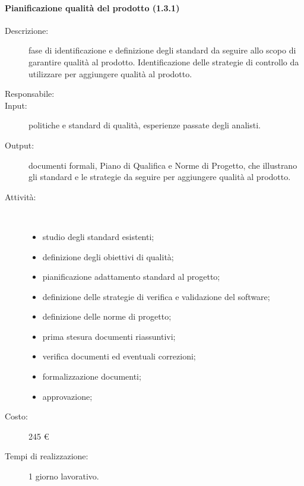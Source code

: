 \begin{description}
\paragraph{Pianificazione qualit\`{a} del prodotto (1.3.1)}
\begin{description}
\item[Descrizione:] fase di identificazione e definizione degli standard da seguire allo scopo di garantire qualit\`{a} al prodotto. Identificazione delle strategie di controllo da utilizzare per aggiungere qualit\`{a} al prodotto.
\item[Responsabile:] 
\item[Input:] politiche e standard di qualità, esperienze passate degli analisti.
\item[Output:] documenti formali, Piano di Qualifica e Norme di Progetto, che illustrano gli standard e le strategie da seguire per aggiungere qualità al prodotto.
\item[Attività:]\mbox{}\\[-1.5\baselineskip]
	\begin{itemize}
	\item studio degli standard esistenti;
	\item definizione degli obiettivi di qualità;
	\item pianificazione adattamento standard al progetto;
	\item definizione delle strategie di verifica e validazione del software;
	\item definizione delle norme di progetto;
	\item prima stesura documenti riassuntivi;
	\item verifica documenti ed eventuali correzioni;
	\item formalizzazione documenti;
	\item approvazione;
	\end{itemize}
\item[Costo:] 245 \euro{}
\item[Tempi di realizzazione:] 1 giorno lavorativo.
\end{description}


\end{description}
